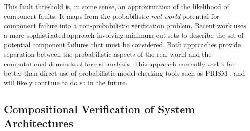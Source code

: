 This fault threshold is, in some sense, an approximation of the likelihood of component faults. It maps from the probabilistic \textit{real world} potential for component failure into a non-probabilistic verification problem. Recent work \cite{CAV2015:BoCiGrMa} uses a more sophisticated approach involving minimum cut sets to describe the set of potential component failures that must be considered. Both approaches provide separation between the probabilistic aspects of the real world and the computational demands of formal analysis. This approach currently scales far better than direct use of probabilistic model checking tools such as PRISM \cite{CAV2011:KwNoPa}, and will likely continue to do so in the future.

\iffalse
\subsection{Compositional Verification of System Architectures}

